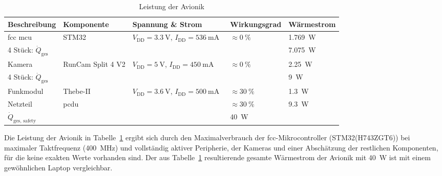 \begin{table}
  \centering
  \caption{Leistung der Avionik}\label{tab:avionik_leistung}

  \begin{tabular}{lp{2.2cm}p{3.3cm}ll}
    \toprule[1pt]
    Beschreibung & Komponente & Spannung \& Strom & Wirkungsgrad & Wärmestrom \\
    \midrule[0.5pt]

    \ac{fcc} \ac{mcu} & STM32 &
      \mbox{$V_\text{DD}=\SI{3,3}{\volt}$},\newline
      $I_\text{DD}=\SI{536}{\milli\ampere}$~\cite{STM32} &
      $\approx \SI{0}{\percent}$ & \SI{1,769}{\watt} \\
    4 Stück: $\dot{Q}_\text{ges}$ & & & & \SI{7,075}{\watt}\\

    \midrule[0.5pt]
    Kamera & RunCam \newline Split 4 V2 &
      \mbox{$V_\text{DD}=\SI{5}{\volt}$},\newline
      $I_\text{DD}=\SI{450}{\milli\ampere}$~\cite{RunCam-Split4V2} &
      $\approx \SI{0}{\percent}$ & \SI{2,25}{\watt} \\
    4 Stück: $\dot{Q}_\text{ges}$ & & & & \SI{9}{\watt}\\

    \midrule[0.5pt]
    Funkmodul & Thebe-II &
      \mbox{$V_\text{DD}=\SI{3,6}{\volt}$},\newline
      $I_\text{DD}=\SI{500}{\milli\ampere}$~\cite{WE-ThebeII-UM-2024} &
      $\approx \SI{30}{\percent}$~\cite{WE-ThebeII-UM-2024} & \SI{1,3}{\watt} \\

    \midrule[0.5pt]
    Netzteil & \ac{pcdu} & & $\approx \SI{30}{\percent}$ & \SI{9,3}{\watt} \\

    \midrule[0.5pt]
    \midrule[0.5pt]
    $\dot{Q}_\text{ges, safety}$ & & & \SI{40}{\watt} \\

    \bottomrule[1pt]
  \end{tabular}
\end{table}

Die Leistung der Avionik in Tabelle~\ref{tab:avionik_leistung} ergibt sich durch den Maximalverbrauch der \ac{fcc}-Mikrocontroller
(STM32(H743ZGT6)) bei maximaler Taktfrequenz (\SI{400}{\mega\hertz}) und vollständig aktiver Peripherie, der Kameras und einer
Abschätzung der restlichen Komponenten, für die keine exakten Werte vorhanden sind. Der aus Tabelle~\ref{tab:avionik_leistung} resultierende gesamte Wärmestrom
der Avionik mit \SI{40}{\watt} ist mit einem gewöhnlichen Laptop vergleichbar.

